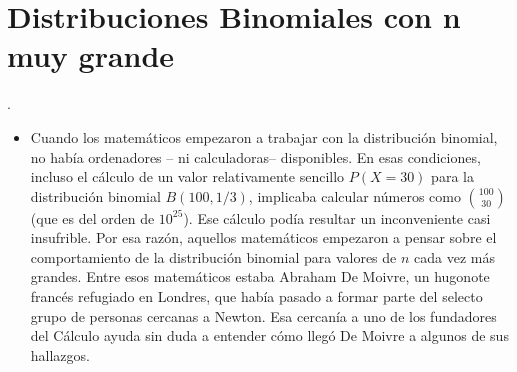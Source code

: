 \section{Distribuciones Binomiales con n muy grande}


.

\begin{itemize}

\item Cuando los matemáticos empezaron a trabajar con la distribución binomial, no había ordenadores -- ni calculadoras-- disponibles. En esas condiciones, incluso el cálculo de un valor relativamente sencillo $P(X=30)$ para la distribución binomial $B(100,1/3)$, implicaba calcular números como $\binom{100}{30}$ (que es del orden de $10^{25}$). Ese cálculo podía resultar un inconveniente casi insufrible. Por esa razón, aquellos matemáticos empezaron a pensar sobre el comportamiento de la distribución binomial para valores de $n$ cada vez más grandes. Entre esos matemáticos estaba Abraham De Moivre, un hugonote francés refugiado en Londres, que había pasado a formar parte del selecto grupo de personas cercanas a Newton. Esa cercanía a uno de los fundadores del Cálculo ayuda sin duda a entender cómo llegó De Moivre a algunos de sus hallazgos.



\end{itemize}
